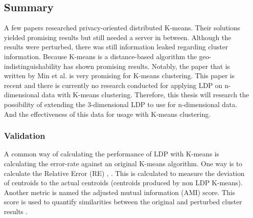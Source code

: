 \subsection*{Summary}
A few papers researched privacy-oriented distributed K-means.
Their solutions yielded promising results but still needed a server in between.
Although the results were perturbed, there was still information leaked regarding cluster information.
Because K-means is a distance-based algorithm the geo-indistinguishability has shown promising results.
Notably, the paper that is written by Min et al. \cite{9646489} is very promising for K-means clustering.
This paper is recent and there is currently no research conducted for applying LDP on n-dimensional data with K-means clustering.
Therefore, this thesis will research the possibility of extending the 3-dimensional LDP to use for n-dimensional data.
And the effectiveness of this data for usage with K-means clustering.

\subsubsection*{Validation}
A common way of calculating the performance of LDP with K-means is calculating the error-rate against an original K-means algorithm.
One way is to calculate the Relative Error (RE) \cite{xia_distributed_2020},  \cite{9679364}.
This is calculated to measure the deviation of centroids to the actual centroids (centroids produced by non LDP K-means).
Another metric is named the adjusted mutual information (AMI) score. This score is used to quantify similarities between the original and perturbed cluster results \cite{9679364}.
